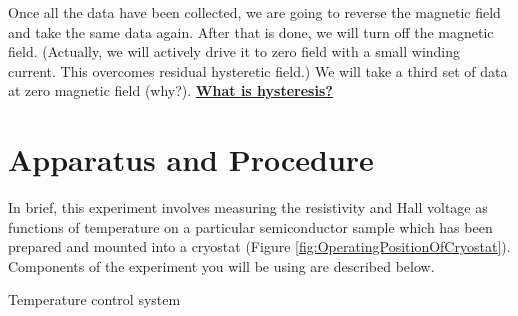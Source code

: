 \documentclass{../lab}
\begin{document}
Once all the data have been collected, we are going to reverse the magnetic field and take the same data again. After that is done, we will turn off the magnetic field. (Actually, we will actively drive it to zero field with a small winding current. This overcomes residual hysteretic field.) We will take a third set of data at zero magnetic field (why?). \href{http://experimentationlab.berkeley.edu/hysteresis}{\textbf{What is hysteresis?}}

\section{Apparatus and Procedure}

In brief, this experiment involves measuring the resistivity and Hall voltage as functions of temperature on a particular semiconductor sample which has been prepared and mounted into a cryostat (Figure \ref{fig:OperatingPositionOfCryostat}). Components of the experiment you will be using are described below.

Temperature control system
\end{document}
